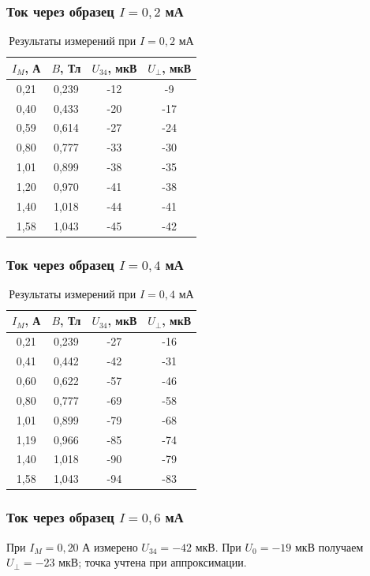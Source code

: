 \documentclass[12pt,a4paper]{article}
\begin{document}
\subsubsection*{Ток через образец $I=0{,}2$ мА}
\begin{table}[H]
\centering
\caption{Результаты измерений при $I=0{,}2$ мА}
\label{tab:hall02}
\begin{tabular}{@{}cccc@{}}
\toprule
$I_M$, А & $B$, Тл & $U_{34}$, мкВ & $U_\perp$, мкВ \\
\midrule
0{,}21 & 0{,}239 & -12 & -9 \\
0{,}40 & 0{,}433 & -20 & -17 \\
0{,}59 & 0{,}614 & -27 & -24 \\
0{,}80 & 0{,}777 & -33 & -30 \\
1{,}01 & 0{,}899 & -38 & -35 \\
1{,}20 & 0{,}970 & -41 & -38 \\
1{,}40 & 1{,}018 & -44 & -41 \\
1{,}58 & 1{,}043 & -45 & -42 \\
\bottomrule
\end{tabular}
\end{table}
\subsubsection*{Ток через образец $I=0{,}4$ мА}
\begin{table}[H]
\centering
\caption{Результаты измерений при $I=0{,}4$ мА}
\label{tab:hall04}
\begin{tabular}{@{}cccc@{}}
\toprule
$I_M$, А & $B$, Тл & $U_{34}$, мкВ & $U_\perp$, мкВ \\
\midrule
0{,}21 & 0{,}239 & -27 & -16 \\
0{,}41 & 0{,}442 & -42 & -31 \\
0{,}60 & 0{,}622 & -57 & -46 \\
0{,}80 & 0{,}777 & -69 & -58 \\
1{,}01 & 0{,}899 & -79 & -68 \\
1{,}19 & 0{,}966 & -85 & -74 \\
1{,}40 & 1{,}018 & -90 & -79 \\
1{,}58 & 1{,}043 & -94 & -83 \\
\bottomrule
\end{tabular}
\end{table}
\subsubsection*{Ток через образец $I=0{,}6$ мА}
При $I_M=0{,}20$ А измерено $U_{34}=-42$ мкВ. При $U_0=-19$ мкВ получаем $U_{\perp}=-23$ мкВ; точка учтена при аппроксимации.
\end{document}
